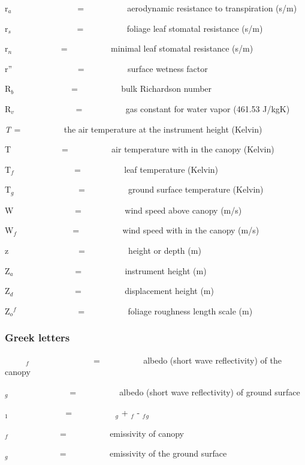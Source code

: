 r\(_{a}\)~~~~~~~~~~~~~~~ = ~~~~~~~~~ aerodynamic resistance to transpiration (s/m)

r\(_{s}\)~~~~~~~~~~~~~~~ = ~~~~~~~~~ foliage leaf stomatal resistance (s/m)

r\(_{n}\)~~~~~~~~~~~ = ~~~~~~~~~ minimal leaf stomatal resistance (s/m)

r''~~~~~~~~~~~~~~~ = ~~~~~~~~~ surface wetness factor

R\(_{b}\)~~~~~~~~~~~~~ = ~~~~~~~~~ bulk Richardson number

R\(_{v}\)~~~~~~~~~~~~~~ = ~~~~~~~~~ gas constant for water vapor (461.53 J/kgK)

\emph{T\(_{ }\)} = ~~~~~~~~~ the air temperature at the instrument height (Kelvin)

T\(_{ }\) ~ ~~~~~~~~~ = ~~~~~~~~~ air temperature with in the canopy (Kelvin)

T\emph{\(_{f}\)}~~ ~~~~~~~~~~~ = ~~~~~~~~~ leaf temperature (Kelvin)

T\(_{g}\) ~~~~~~~~~~~~~~ = ~~~~~~~~~ ground surface temperature (Kelvin)

W~~~~~~~~~~~~~~ = ~~~~~~~~~ wind speed above canopy (m/s)

W\(_{f}\)~ ~~~~~~~~~~~ = ~~~~~~~~~ wind speed with in the canopy (m/s)

z~~~~~~~~~~~~~~~~ = ~~~~~~~~~ height or depth (m)

Z\(_{a}\)~~~~~~~~~~~~~~ = ~~~~~~~~~ instrument height (m)

Z\(_{d}\)~~~~~~~~~~~~~~ = ~~~~~~~~~ displacement height (m)

Z\(_{o}\)\(^{f}\)~~~~~~~~~~~~~~ = ~~~~~~~~~ foliage roughness length scale (m)

\subsubsection{Greek letters}\label{greek-letters-000}

~~~~~\alpha\(_{f}\)~~~ ~~~~~~~~~~~ = ~~~~~~~~~ albedo (short wave reflectivity) of the canopy

\alpha\(_{g}\)~~~~~~~~~~~~~~ = ~~~~~~~~~ albedo (short wave reflectivity) of ground surface

\varepsilon\(_{1}\)~~~~~~~~~~~~~ = ~~~~~~~~~ \varepsilon\(_{g}\) + \varepsilon\(_{f}\)  - \varepsilon\(_{f}\)\varepsilon\(_{g}\)

\varepsilon\(_{f}\) ~~~~~~~~~~~ = ~~~~~~~~~ emissivity of canopy 

\varepsilon\(_{g}\) ~~~~~~~~~~~ = ~~~~~~~~~ emissivity of the ground surface

